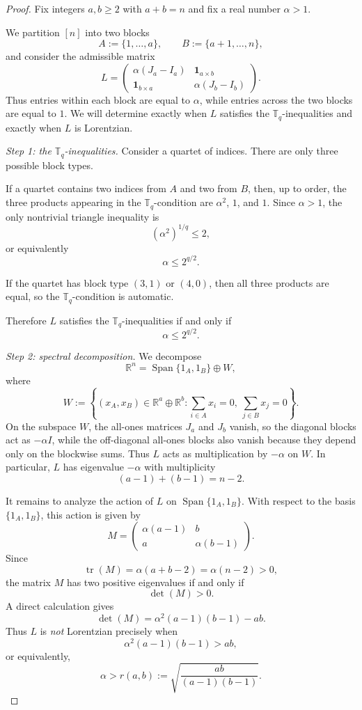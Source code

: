 \documentclass[12pt]{amsart}
\theoremstyle{definition}
\newcommand{\1}{\mathbf{1}}
\newcommand{\tr}{\operatorname{tr}}
\DeclareMathOperator{\Span}{Span}
\newcommand\R{{\mathbb R}}
\newcommand\T{{\mathbb T}}
\begin{document}
\begin{proof}
Fix integers $a,b\ge 2$ with $a+b=n$ and fix a real number $\alpha>1$.

We partition $[n]$ into two blocks
\[
A:=\{1,\dots,a\},
\qquad
B:=\{a+1,\dots,n\},
\]
and consider the admissible matrix
\[
L=
\begin{pmatrix}
\alpha(J_a-I_a) & \mathbf 1_{a\times b}\\
\mathbf 1_{b\times a} & \alpha(J_b-I_b)
\end{pmatrix}.
\]
Thus entries within each block are equal to $\alpha$, while entries across the
two blocks are equal to $1$.  We will determine exactly when $L$ satisfies the
$\T_q$-inequalities and exactly when $L$ is Lorentzian.

\smallskip

\emph{Step 1: the $\T_q$-inequalities.}
Consider a quartet of indices. There are only three possible block types.

If a quartet contains two indices from $A$ and two from $B$, then, up to order,
the three products appearing in the $\T_q$-condition are $\alpha^2$, $1$, and $1$.
Since $\alpha>1$, the only nontrivial triangle inequality is
\[
(\alpha^2)^{1/q}\le 2,
\]
or equivalently
\[
\alpha\le 2^{q/2}.
\]

If the quartet has block type $(3,1)$ or $(4,0)$, then all three products are
equal, so the $\T_q$-condition is automatic.

Therefore $L$ satisfies the $\T_q$-inequalities if and only if
\begin{equation}
\label{eq:qn-upper-Tq-condition}
\alpha\le 2^{q/2}.
\end{equation}

\smallskip

\emph{Step 2: spectral decomposition.}
We decompose
\[
\R^n = \Span\{1_A,1_B\} \oplus W,
\]
where
\[
W:=
\left\{
(x_A,x_B)\in \R^a\oplus\R^b :
\sum_{i\in A}x_i=0,\ \sum_{j\in B}x_j=0
\right\}.
\]
On the subspace $W$, the all-ones matrices $J_a$ and $J_b$ vanish, so the
diagonal blocks act as $-\alpha I$, while the off-diagonal all-ones blocks also
vanish because they depend only on the blockwise sums.  Thus $L$ acts as
multiplication by $-\alpha$ on $W$.  In particular, $L$ has eigenvalue
$-\alpha$ with multiplicity
\[
(a-1)+(b-1)=n-2.
\]

It remains to analyze the action of $L$ on $\Span\{1_A,1_B\}$.  With respect to
the basis $\{1_A,1_B\}$, this action is given by
\[
M=
\begin{pmatrix}
\alpha(a-1) & b\\
a & \alpha(b-1)
\end{pmatrix}.
\]
Since
\[
\tr(M)=\alpha(a+b-2)=\alpha(n-2)>0,
\]
the matrix $M$ has two positive eigenvalues if and only if
\[
\det(M)>0.
\]
A direct calculation gives
\[
\det(M)=\alpha^2(a-1)(b-1)-ab.
\]
Thus $L$ is \emph{not} Lorentzian precisely when
\[
\alpha^2(a-1)(b-1)>ab,
\]
or equivalently,
\begin{equation}
\label{eq:qn-upper-nonlor}
\alpha>r(a,b):=
\sqrt{\frac{ab}{(a-1)(b-1)}}.
\end{equation}


\end{proof}
\end{document}
